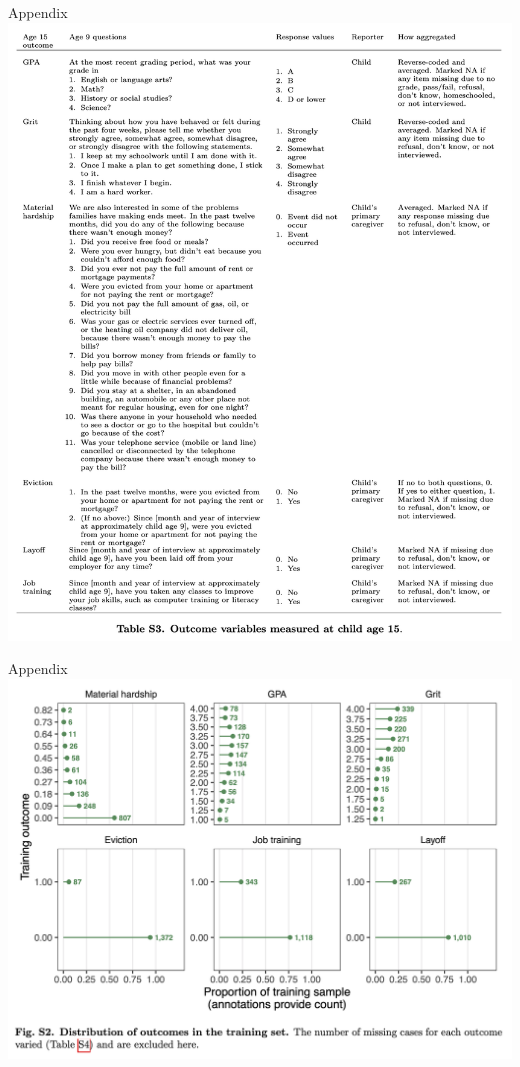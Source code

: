 \documentclass{beamer}
\begin{document}
\begin{frame}{Appendix}
\centering
\includegraphics[height = .8\textheight]{figures/si_outcome_text}
\end{frame}

\begin{frame}{Appendix}
\includegraphics[width = \textwidth]{figures/si_outcome_histograms}
\end{frame}
\end{document}
